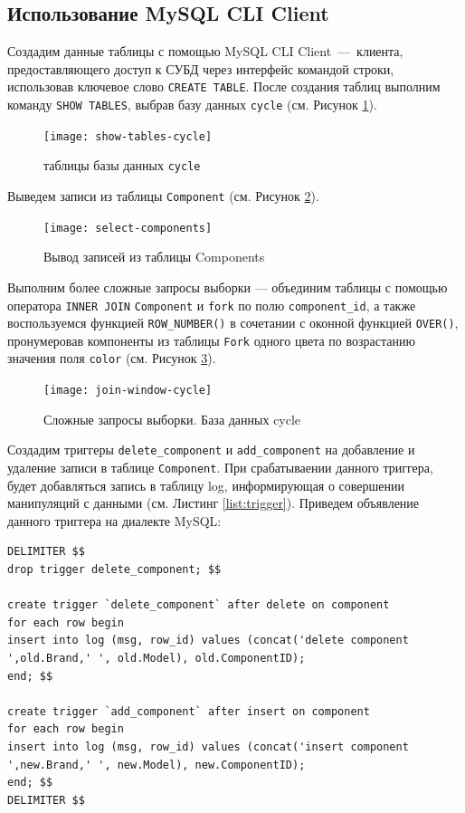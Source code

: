 \newpage\hfill\newpage\hfill\newpage

\subsection{Использование MySQL CLI Client}

Создадим данные таблицы с помощью MySQL CLI Client~---~клиента, предоставляющего доступ к СУБД через интерфейс командой строки, использовав ключевое слово \texttt{CREATE TABLE}. После создания таблиц выполним команду \texttt{SHOW TABLES}, выбрав базу данных \texttt{cycle} (см. Рисунок \ref{fig:show-tables-cycle}).

\begin{figure}[h!]
	\centering
	\texttt{[image: show-tables-cycle]}
	\caption{таблицы базы данных \texttt{cycle}}
	\label{fig:show-tables-cycle}
\end{figure}
Выведем записи из таблицы \texttt{Component} (см. Рисунок \ref{fig:select-components}).

\begin{figure}[h!]
	\centering
	\texttt{[image: select-components]}
	\caption{Вывод записей из таблицы Components}
	\label{fig:select-components}
\end{figure}

Выполним более сложные запросы выборки --- объединим таблицы с помощью оператора \texttt{INNER JOIN} \texttt{Component} и \texttt{fork} по полю \linebreak \texttt{component\_id}, а также воспользуемся функцией \texttt{ROW\_NUMBER()} в сочетании с оконной функцией \texttt{OVER()}, пронумеровав компоненты из таблицы \texttt{Fork} одного цвета по возрастанию значения поля \texttt{color} (см. Рисунок \ref{fig:join-window-cycle}).

\begin{figure}[h!]
	\centering
	\texttt{[image: join-window-cycle]}
	\caption{Сложные запросы выборки. База данных cycle}
	\label{fig:join-window-cycle}
\end{figure}


Создадим триггеры \texttt{delete\_component} и  \texttt{add\_component} на добавление и удаление записи в таблице \texttt{Component}. При срабатываении данного триггера, будет добавляться запись в таблицу log, информирующая о совершении манипуляций с данными (см. Листинг \ref{list:trigger}).
Приведем объявление данного триггера на диалекте MySQL:
\lstset{
	language=sql
}
\begin{lstlisting}[caption=Триггер, label={list:trigger}]
DELIMITER $$
drop trigger delete_component; $$

create trigger `delete_component` after delete on component
for each row begin
insert into log (msg, row_id) values (concat('delete component ',old.Brand,' ', old.Model), old.ComponentID);
end; $$

create trigger `add_component` after insert on component
for each row begin
insert into log (msg, row_id) values (concat('insert component ',new.Brand,' ', new.Model), new.ComponentID);
end; $$
DELIMITER $$
\end{lstlisting}

